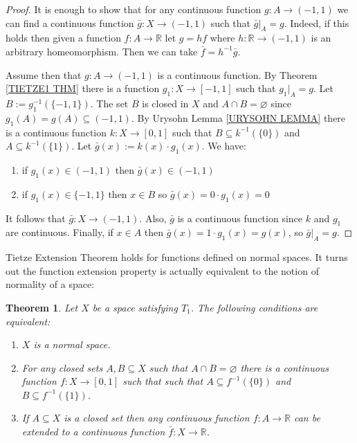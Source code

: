 \documentclass[11pt, letterpaper, oneside]{report}
\theoremstyle{pplain}
\newtheorem{theorem}{Theorem}[chapter]
\newtheorem{ITERMVALUE THM}[theorem]{Intermediate Value Theorem}
\newtheorem{HEINEBOREL THM}[theorem]{Heine-Borel Theorem}
\newtheorem{UMETR THM}[theorem]{Urysohn Metrization Theorem}
\newtheorem{UMETR2 THM}[theorem]{Urysohn Metrization Theorem (v.2)}
\theoremstyle{ddefinition}
\theoremstyle{nnn}
\newtheorem{TDA NN}[theorem]{Topological Data Analysis. }
\theoremstyle{eexercise}
\newcommand{\R}{{\mathbb R}}
\newcommand{\benu}{\begin{enumerate}}
\newcommand{\eenu}{\end{enumerate}}
\begin{document}
 
\begin{proof}
It is enough to show that for any continuous function  $g\colon A\to (-1,  1)$ we can find 
a continuous function $\bar{g}\colon X \to (-1, 1)$ such that $\bar{g}|_{A} = g$. Indeed, 
if this holds  then given a function $f\colon A\to \R$ let  $g= hf$ where $h\colon \R\to (-1, 1)$
is an arbitrary homeomorphism.  Then we can take $\bar{f} = h^{-1}\bar{g}$. 

Assume then that $g\colon A\to (-1, 1)$ is a continuous function. By 
Theorem \ref{TIETZE1 THM} there is a function  $g_{1}\colon X\to [-1, 1]$ such that $g_{1}|_{A} = g$. 
Let $B:= g_{1}^{-1}(\{-1, 1\})$. The set $B$ is closed in $X$ and $A\cap B = \varnothing$ since 
$g_{1}(A) = g(A)\subseteq (-1, 1)$. By Urysohn Lemma \ref{URYSOHN LEMMA} there is a 
continuous function $k\colon X\to [0, 1]$ such that $B \subseteq k^{-1}(\{0\})$ and $A \subseteq  k^{-1}(\{1\})$.
Let  $\bar{g}(x) := k(x)\cdot g_{1}(x)$. We have:
\benu
\item if $g_{1}(x)\in (-1, 1)$ then $\bar{g}(x)\in (-1, 1)$
\item if $g_{1}(x) \in \{-1, 1\}$ then $x\in B$ so $\bar{g}(x) = 0\cdot g_{1}(x) = 0$
\eenu 
It follows that $\bar{g}\colon X\to (-1, 1)$. Also, $\bar{g}$ is a continuous function since $k$ and 
$g_{1}$ are continuous. Finally, if $x\in A$ then $\bar{g}(x) = 1\cdot g_{1}(x) = g(x)$, 
so  $\bar{g}|_{A} = g$. 
\end{proof}

Tietze Extension Theorem holds for functions defined on normal spaces. It turns out 
the function extension property is actually equivalent to the notion of normality of a space: 

\begin{theorem}
\label{EQUIV NORMALITY THM}
Let $X$ be a space satisfying $T_{1}$. The following conditions are equivalent:
\benu
\item $X$ is a normal space. 
\item For any closed sets  $A, B\subseteq X$ such that $A\cap B = \varnothing$
there is a continuous function $f\colon X\to [0, 1]$ such that such that $A\subseteq f^{-1}(\{0\})$ 
and $B \subseteq f^{-1}(\{1\})$. 
\item If $A\subseteq X$ is a closed set then any continuous function $f\colon A\to \R$ can be extended 
to a continuous function $\bar{f}\colon X\to \R$. 

\eenu
\end{theorem}
\end{document}
